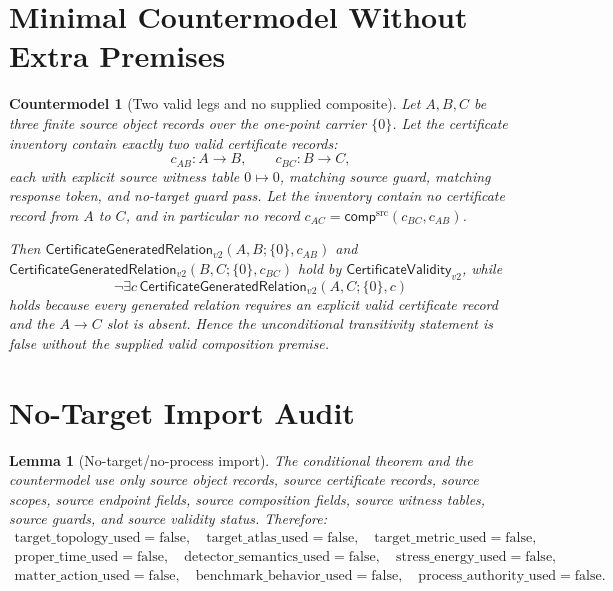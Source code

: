 \documentclass[11pt]{article}
\newcommand{\ValidTwo}{\mathsf{CertificateValidity}_{v2}}
\newcommand{\GenRel}{\mathsf{CertificateGeneratedRelation}_{v2}}
\newcommand{\CComp}{\mathsf{comp}^{\mathrm{src}}}
\newtheorem{lemma}{Lemma}
\newtheorem{countermodel}{Countermodel}
\begin{document}
\section{Minimal Countermodel Without Extra Premises}

\begin{countermodel}[Two valid legs and no supplied composite]
Let \(A,B,C\) be three finite source object records over the one-point carrier
\(\{0\}\). Let the certificate inventory contain exactly two valid certificate
records:
\[
  c_{AB}:A\to B,\qquad c_{BC}:B\to C,
\]
each with explicit source witness table \(0\mapsto 0\), matching source guard,
matching response token, and no-target guard pass. Let the inventory contain
no certificate record from \(A\) to \(C\), and in particular no record
\(c_{AC}=\CComp(c_{BC},c_{AB})\).

Then \(\GenRel(A,B;\{0\},c_{AB})\) and
\(\GenRel(B,C;\{0\},c_{BC})\) hold by \(\ValidTwo\), while
\[
  \neg\exists c\,\GenRel(A,C;\{0\},c)
\]
holds because every generated relation requires an explicit valid certificate
record and the \(A\to C\) slot is absent. Hence the unconditional
transitivity statement is false without the supplied valid composition
premise.
\end{countermodel}

\section{No-Target Import Audit}

\begin{lemma}[No-target/no-process import]
The conditional theorem and the countermodel use only source object records,
source certificate records, source scopes, source endpoint fields, source
composition fields, source witness tables, source guards, and source validity
status. Therefore:
\[
\begin{gathered}
\mathrm{target\_topology\_used}=\mathrm{false},\quad
\mathrm{target\_atlas\_used}=\mathrm{false},\quad
\mathrm{target\_metric\_used}=\mathrm{false},\\
\mathrm{proper\_time\_used}=\mathrm{false},\quad
\mathrm{detector\_semantics\_used}=\mathrm{false},\quad
\mathrm{stress\_energy\_used}=\mathrm{false},\\
\mathrm{matter\_action\_used}=\mathrm{false},\quad
\mathrm{benchmark\_behavior\_used}=\mathrm{false},\quad
\mathrm{process\_authority\_used}=\mathrm{false}.
\end{gathered}
\]
\end{lemma}
\end{document}
